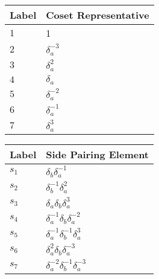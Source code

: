 \documentclass{article}
\begin{document}
\begin{center}
\begin{tabular}{ll}
\toprule
Label & Coset Representative\\
\midrule
$1$ & 1 \\
$2$ & $\delta_a^{-3}$ \\
$3$ & $\delta_a^{2}$ \\
$4$ & $\delta_a^{}$ \\
$5$ & $\delta_a^{-2}$ \\
$6$ & $\delta_a^{-1}$ \\
$7$ & $\delta_a^{3}$ \\
\bottomrule
\end{tabular}
\hfill
\begin{tabular}{ll}
\toprule
Label & Side Pairing Element\\
\midrule
$s_{1}$ & $\delta_b^{}\delta_a^{-1}$ \\
$s_{2}$ & $\delta_b^{-1}\delta_a^{2}$ \\
$s_{3}$ & $\delta_a^{}\delta_b^{}\delta_a^{3}$ \\
$s_{4}$ & $\delta_a^{-1}\delta_b^{}\delta_a^{-2}$ \\
$s_{5}$ & $\delta_a^{-1}\delta_b^{-1}\delta_a^{3}$ \\
$s_{6}$ & $\delta_a^{2}\delta_b^{}\delta_a^{-3}$ \\
$s_{7}$ & $\delta_a^{-2}\delta_b^{-1}\delta_a^{-3}$ \\
\bottomrule
\end{tabular}
\end{center}

\thispagestyle{empty}
\end{document}
